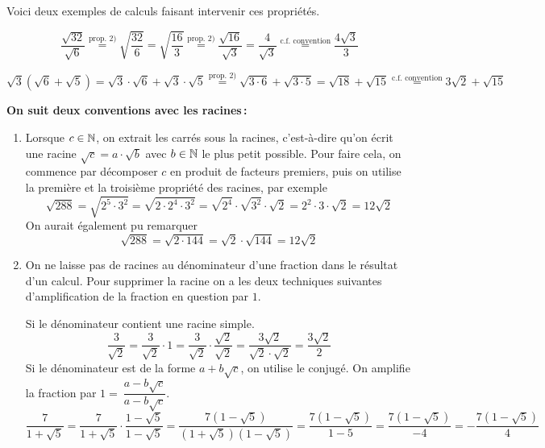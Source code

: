 \documentclass[a4paper,12pt]{report}
\begin{document}
Voici deux exemples de calculs faisant intervenir ces propriétés.

\[\dfrac{\sqrt{32}}{\sqrt{6}}\stackrel{\text{prop. } 2)}{=}\sqrt{\dfrac{32}{6}}=\sqrt{\dfrac{16}{3}}\stackrel{\text{prop. } 2)}{=}\dfrac{\sqrt{16}}{\sqrt{3}}=\dfrac{4}{\sqrt{3}}\stackrel{\text{c.f. convention}}{=}\dfrac{4\sqrt{3}}{3}\]

\[\sqrt{3}(\sqrt{6}+\sqrt{5})=\sqrt{3}\cdot \sqrt{6}+\sqrt{3}\cdot \sqrt{5}\stackrel{\text{prop. } 2)}{=}\sqrt{3\cdot 6}+\sqrt{3\cdot 5}=\sqrt{18}+\sqrt{15}\stackrel{\text{c.f. convention}}{=}3\sqrt{2}+\sqrt{15}\] 

{\bfseries On suit deux conventions avec les racines\,:}

\begin{enumerate}[label={\arabic*)}]
	\item Lorsque $c\in \mathbb N$, on extrait les carrés sous la racines, c'est-à-dire qu'on écrit une racine $\sqrt{c}=a\cdot \sqrt{b}$ avec $b\in \mathbb N$ le plus petit possible. Pour faire cela, on commence par décomposer $c$ en produit de facteurs premiers, puis on utilise la première et la troisième propriété des racines, par exemple
		\[\sqrt{288}=\sqrt{2^5\cdot 3^2}=\sqrt{2\cdot 2^4\cdot 3^2}=\sqrt{2^4}\cdot \sqrt{3^2}\cdot \sqrt{2}=2^2\cdot 3\cdot \sqrt{2}=12\sqrt{2}\]
		On aurait également pu remarquer
		\[\sqrt{288}=\sqrt{2\cdot 144}=\sqrt{2}\cdot \sqrt{144}=12\sqrt{2}\]
	\item On ne laisse pas de racines au dénominateur d'une fraction dans le résultat d'un calcul. Pour supprimer la racine on a les deux techniques suivantes d'amplification de la fraction en question par $1$.
		
		Si le dénominateur contient une racine simple. 
	\[\dfrac{3}{\sqrt{2}}=\dfrac{3}{\sqrt{2}}\cdot 1=\dfrac{3}{\sqrt{2}}\cdot\dfrac{\sqrt{2}}{\sqrt{2}}=\dfrac{3\sqrt{2}}{\sqrt{2}\cdot \sqrt{2}}=\dfrac{3\sqrt{2}}{2}\]
	Si le dénominateur est de la forme $a+b\sqrt{c}$, on utilise le conjugé. On amplifie la fraction par $1=~\dfrac{a-b\sqrt{c}}{a-b\sqrt{c}}$. 
	\[\dfrac{7}{1+\sqrt{5}}=\dfrac{7}{1+\sqrt{5}}\cdot \dfrac{1-\sqrt{5}}{1-\sqrt{5}}=\dfrac{7(1-\sqrt{5})}{(1+\sqrt{5})(1-\sqrt{5})}=\dfrac{7(1-\sqrt{5})}{1-5}=\dfrac{7(1-\sqrt{5})}{-4}=-\dfrac{7(1-\sqrt{5})}{4}\]
\end{enumerate}


\vspace{1cm}
\end{document}
